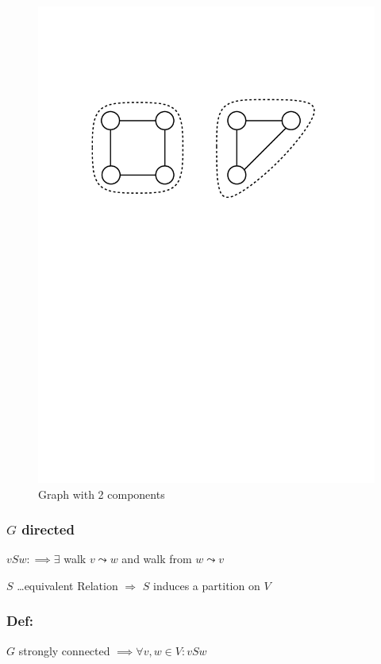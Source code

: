 \begin{figure}[htb]
	\centering
	\includegraphics[scale=.5]{01_graph_theory/pics/components.pdf}
	\caption{Graph with 2 components}
\end{figure}
\FloatBarrier


\subsubsection*{$G$ directed}
$vSw : \implies \exists$ walk $v \leadsto w$ and walk from $w \leadsto v$

$S$ \ldots equivalent Relation $\Rightarrow$ $S$ induces a partition on $V$

\subsubsection*{Def:}
$G$ strongly connected $\implies \forall v,w \in V: vSw$ 


